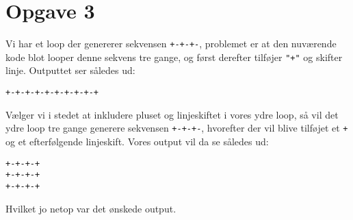 \documentclass{scrartcl}
\newcommand\code[1]{\texttt{#1}}
\begin{document}
\section*{Opgave 3}
Vi har et loop der genererer sekvensen \code{+-+-+-}, problemet er at den nuværende kode blot looper denne sekvens tre gange, og først derefter tilføjer \code{"+"} og skifter linje. Outputtet ser således ud:
\begin{Verbatim}
+-+-+-+-+-+-+-+-+-+
\end{Verbatim}
Vælger vi i stedet at inkludere pluset og linjeskiftet i vores ydre loop, så vil det ydre loop tre gange generere sekvensen \code{+-+-+-}, hvorefter der vil blive tilføjet et \code{+} og et efterfølgende linjeskift.
Vores output vil da se således ud:
\begin{Verbatim}
+-+-+-+
+-+-+-+
+-+-+-+
\end{Verbatim}
Hvilket jo netop var det ønskede output.
\end{document}
